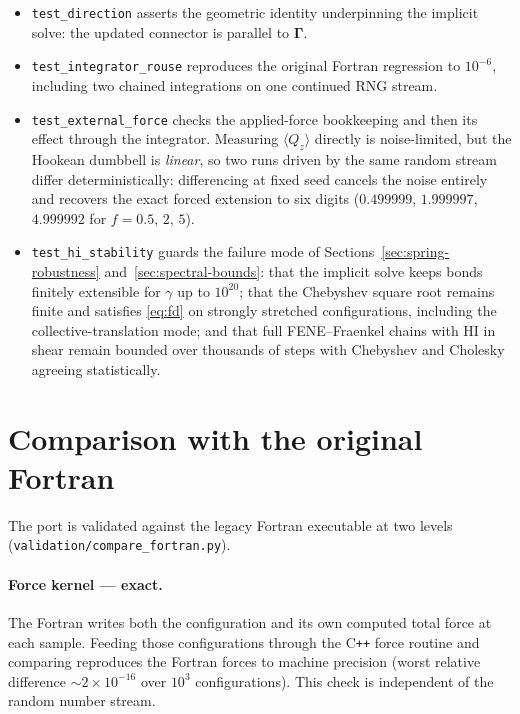 \documentclass[11pt,a4paper]{report}
\newcommand{\code}[1]{\texttt{\seqsplitcode{#1}}}
\newcommand{\seqsplitcode}[1]{#1}
\begin{document}
\begin{itemize}
  \item \code{test\_direction} asserts the geometric identity underpinning the
        implicit solve: the updated connector is parallel to $\bm{\Gamma}$.
  \item \code{test\_integrator\_rouse} reproduces the original Fortran
        regression to $10^{-6}$, including two chained integrations on one
        continued RNG stream.
  \item \code{test\_external\_force} checks the applied-force bookkeeping and
        then its effect through the integrator. Measuring $\langle Q_z\rangle$
        directly is noise-limited, but the Hookean dumbbell is \emph{linear}, so
        two runs driven by the same random stream differ deterministically:
        differencing at fixed seed cancels the noise entirely and recovers the
        exact forced extension to six digits ($0.499999$, $1.999997$, $4.999992$
        for $f = 0.5,\,2,\,5$).
  \item \code{test\_hi\_stability} guards the failure mode of
        Sections~\ref{sec:spring-robustness} and~\ref{sec:spectral-bounds}: that
        the implicit solve keeps bonds finitely extensible for
        $\gamma$ up to $10^{20}$; that the Chebyshev square root remains finite
        and satisfies \eqref{eq:fd} on strongly stretched configurations,
        including the collective-translation mode; and that full FENE--Fraenkel
        chains with HI in shear remain bounded over thousands of steps with
        Chebyshev and Cholesky agreeing statistically.
\end{itemize}

\section{Comparison with the original Fortran}
\label{sec:fortran-compare}

The port is validated against the legacy Fortran executable at two levels
(\code{validation/compare\_fortran.py}).

\paragraph{Force kernel --- exact.} The Fortran writes both the configuration and
its own computed total force at each sample. Feeding those configurations through
the C\texttt{++} force routine and comparing reproduces the Fortran forces to
machine precision (worst relative difference $\sim 2\times10^{-16}$ over $10^{3}$
configurations). This check is independent of the random number stream.
\end{document}
